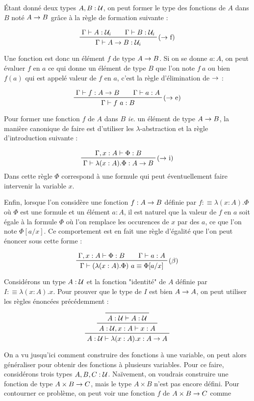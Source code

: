 \documentclass[../../rapport.tex]{subfiles}
\begin{document}
  Étant donné deux types $A, B : \mathcal U$, on peut former le type des fonctions de $A$ dans $B$ noté $A \rightarrow B$
  grâce à la règle de formation suivante :

  $$
  \prfinterspace=2em
  \prftree[r]{($\fun$ f)}{\Gamma \vdash A : \U_i}{\Gamma \vdash B : \U_i}{\Gamma \vdash A \fun B : \U_i}
  $$

  Une fonction est donc un élément $f$ de type $A \rightarrow B$.
  Si on se donne $a : A$, on peut évaluer $f$ en $a$ ce qui donne un élément de type $B$
  que l'on note $f\ a$ ou bien $f(a)$ qui est appelé valeur de $f$ en $a$, c'est la règle d'élimination de $\rightarrow$ :

  $$
  \prfinterspace=2em
  \prftree[r]{($\fun$ e)}{\Gamma \vdash f : A \fun B}{\Gamma \vdash a : A}{\Gamma \vdash f\ a : B}
  $$

  Pour former une fonction $f$ de $A$ dans $B$ \textit{ie.} un élément de type $A \rightarrow B$,
  la manière canonique de faire est d'utiliser les $\lambda$-abstraction et la règle d'introduction suivante :

  $$
  \prftree[r]{($\fun$ i)}{\Gamma, x : A \vdash \Phi : B}{\Gamma \vdash \lambda (x : A). \Phi : A \fun B}
  $$
  Dans cette règle $\Phi$ correspond à une formule qui peut éventuellement faire intervenir la variable $x$.

  Enfin, lorsque l'on considère une fonction $f : A \rightarrow B$ définie par $f :\equiv \lambda (x : A). \Phi$
  où $\Phi$ est une formule et un élément $a : A$, il est naturel que la valeur de $f$ en $a$ soit égale à
  la formule $\Phi$ où l'on remplace les occurences de $x$ par des $a$, ce que l'on note $\Phi[a/x]$.
  Ce comportement est en fait une règle d'égalité que l'on peut énoncer sous cette forme :

  $$
  \prfinterspace=2em
  \prftree[r]{($\beta$)}{\Gamma, x : A \vdash \Phi : B}{\Gamma \vdash a : A}
    {\Gamma \vdash (\lambda(x : A).\Phi)\ a \equiv \Phi[a/x]}
  $$

  \begin{example}
    Considérons un type $A : \mathcal U$ et la fonction "identité" de $A$ définie par $I :\equiv \lambda(x : A).x$.
    Pour prouver que le type de $I$ est bien $A \rightarrow A$, on peut utiliser les règles énoncées précédemment :

    $$
    \prftree
      {\prftree
	{\prfaxiom{A : \U \vdash A : \U}}
	{A : \U, x : A \vdash x : A}}
      {A : \U \vdash \lambda(x : A). x : A \fun A}
    $$
  \end{example}

  On a vu jusqu'ici comment construire des fonctions à une variable, on peut alors généraliser pour obtenir
  des fonctions à plusieurs variables.
  Pour ce faire, considérons trois types $A, B, C : \mathcal U$.
  Naïvement, on voudrais construire une fonction de type $A \times B \rightarrow C$,
  mais le type $A \times B$ n'est pas encore défini.
  Pour contourner ce problème, on peut voir une fonction $f$ de $A \times B \rightarrow C$ comme
\end{document}

